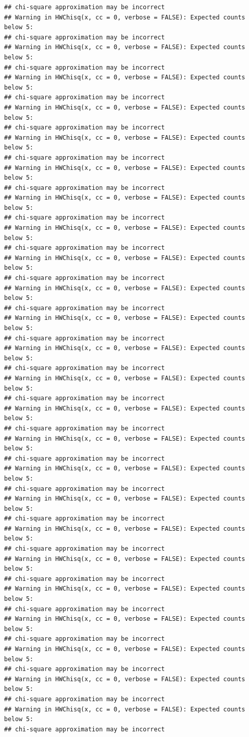 \documentclass[
]{article}
\begin{document}
\begin{verbatim}
## chi-square approximation may be incorrect
## Warning in HWChisq(x, cc = 0, verbose = FALSE): Expected counts below 5:
## chi-square approximation may be incorrect
## Warning in HWChisq(x, cc = 0, verbose = FALSE): Expected counts below 5:
## chi-square approximation may be incorrect
## Warning in HWChisq(x, cc = 0, verbose = FALSE): Expected counts below 5:
## chi-square approximation may be incorrect
## Warning in HWChisq(x, cc = 0, verbose = FALSE): Expected counts below 5:
## chi-square approximation may be incorrect
## Warning in HWChisq(x, cc = 0, verbose = FALSE): Expected counts below 5:
## chi-square approximation may be incorrect
## Warning in HWChisq(x, cc = 0, verbose = FALSE): Expected counts below 5:
## chi-square approximation may be incorrect
## Warning in HWChisq(x, cc = 0, verbose = FALSE): Expected counts below 5:
## chi-square approximation may be incorrect
## Warning in HWChisq(x, cc = 0, verbose = FALSE): Expected counts below 5:
## chi-square approximation may be incorrect
## Warning in HWChisq(x, cc = 0, verbose = FALSE): Expected counts below 5:
## chi-square approximation may be incorrect
## Warning in HWChisq(x, cc = 0, verbose = FALSE): Expected counts below 5:
## chi-square approximation may be incorrect
## Warning in HWChisq(x, cc = 0, verbose = FALSE): Expected counts below 5:
## chi-square approximation may be incorrect
## Warning in HWChisq(x, cc = 0, verbose = FALSE): Expected counts below 5:
## chi-square approximation may be incorrect
## Warning in HWChisq(x, cc = 0, verbose = FALSE): Expected counts below 5:
## chi-square approximation may be incorrect
## Warning in HWChisq(x, cc = 0, verbose = FALSE): Expected counts below 5:
## chi-square approximation may be incorrect
## Warning in HWChisq(x, cc = 0, verbose = FALSE): Expected counts below 5:
## chi-square approximation may be incorrect
## Warning in HWChisq(x, cc = 0, verbose = FALSE): Expected counts below 5:
## chi-square approximation may be incorrect
## Warning in HWChisq(x, cc = 0, verbose = FALSE): Expected counts below 5:
## chi-square approximation may be incorrect
## Warning in HWChisq(x, cc = 0, verbose = FALSE): Expected counts below 5:
## chi-square approximation may be incorrect
## Warning in HWChisq(x, cc = 0, verbose = FALSE): Expected counts below 5:
## chi-square approximation may be incorrect
## Warning in HWChisq(x, cc = 0, verbose = FALSE): Expected counts below 5:
## chi-square approximation may be incorrect
## Warning in HWChisq(x, cc = 0, verbose = FALSE): Expected counts below 5:
## chi-square approximation may be incorrect
## Warning in HWChisq(x, cc = 0, verbose = FALSE): Expected counts below 5:
## chi-square approximation may be incorrect
## Warning in HWChisq(x, cc = 0, verbose = FALSE): Expected counts below 5:
## chi-square approximation may be incorrect
## Warning in HWChisq(x, cc = 0, verbose = FALSE): Expected counts below 5:
## chi-square approximation may be incorrect
\end{verbatim}
\end{document}
